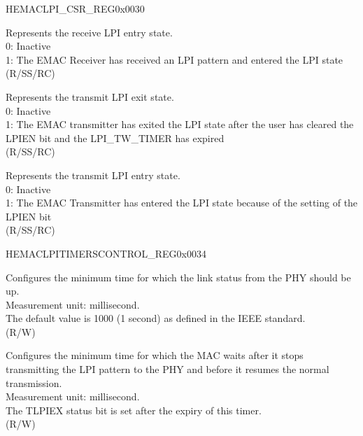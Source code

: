 \addtocounter{Regfloat}{-1}
\begin{register}{H}{EMACLPI\_CSR\_REG}{0x0030}
\begin{regdesc}\begin{reglist}
\item[Continued from the previous page...]

\item [RLPIEN] Represents the receive LPI entry state.\\
0: Inactive\\
1: The EMAC Receiver has received an LPI pattern and entered the LPI state\\ (R/SS/RC)
\item [TLPIEX] Represents the transmit LPI exit state.\\
0: Inactive\\
1: The EMAC transmitter has exited the LPI state after the user has cleared the LPIEN bit and the LPI\_TW\_TIMER has expired\\ (R/SS/RC)
\item [TLPIEN] Represents the transmit LPI entry state.\\
0: Inactive\\
1: The EMAC Transmitter has entered the LPI state because of the setting of the LPIEN bit\\(R/SS/RC)
\end{reglist}\end{regdesc}
\end{register}


\begin{register}{H}{EMACLPITIMERSCONTROL\_REG}{0x0034}\label{regdesc:EMACLPITIMERSCONTROLREG}
%
%
%
\regnewline%
\begin{regdesc}\begin{reglist}
\item [LPI\_LS\_TIMER] Configures the minimum time for which the link status from the PHY should be up.\\
Measurement unit: millisecond.\\
The default value is 1000 (1 second) as defined in the IEEE standard.\\ (R/W)
\item [LPI\_TW\_TIMER] Configures the minimum time for which the MAC waits after it stops transmitting the LPI pattern to the PHY and before it resumes the normal transmission.\\
Measurement unit: millisecond.\\
The TLPIEX status bit is set after the expiry of this timer.\\ (R/W)
\end{reglist}\end{regdesc}
\end{register}




